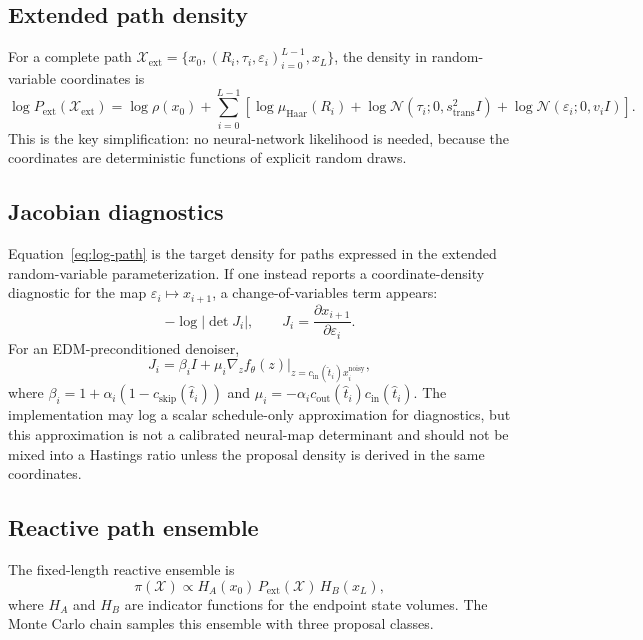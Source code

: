 \documentclass[11pt,a4paper]{article}
\newcommand{\N}{\mathcal{N}}
\newcommand{\Haar}{\mu_{\mathrm{Haar}}}
\newcommand{\ftheta}{f_\theta}
\newcommand{\that}{\hat t}
\newcommand{\xnoisy}{x^{\mathrm{noisy}}}
\newcommand{\cskip}{c_{\mathrm{skip}}}
\newcommand{\cout}{c_{\mathrm{out}}}
\newcommand{\cin}{c_{\mathrm{in}}}
\begin{document}
\subsection{Extended path density}

For a complete path
$\mathcal{X}_{\mathrm{ext}}=\{x_0,(R_i,\tau_i,\varepsilon_i)_{i=0}^{L-1},x_L\}$,
the density in random-variable coordinates is
\begin{equation}
  \log P_{\mathrm{ext}}(\mathcal{X}_{\mathrm{ext}})
  =
  \log \rho(x_0)
  +
  \sum_{i=0}^{L-1}
  \left[
    \log \Haar(R_i)
    + \log \N(\tau_i;0,s_{\mathrm{trans}}^2I)
    + \log \N(\varepsilon_i;0,v_iI)
  \right].
  \label{eq:log-path}
\end{equation}
This is the key simplification: no neural-network likelihood is needed, because
the coordinates are deterministic functions of explicit random draws.

\subsection{Jacobian diagnostics}

Equation~\eqref{eq:log-path} is the target density for paths expressed in the
extended random-variable parameterization. If one instead reports a
coordinate-density diagnostic for the map
$\varepsilon_i \mapsto x_{i+1}$, a change-of-variables term appears:
\begin{equation}
  -\log |\det J_i|,\qquad
  J_i = \frac{\partial x_{i+1}}{\partial \varepsilon_i}.
\end{equation}
For an EDM-preconditioned denoiser,
\begin{equation}
  J_i =
  \beta_i I
  +
  \mu_i \nabla_z \ftheta(z)\big|_{z=\cin(\that_i)\xnoisy_i},
\end{equation}
where $\beta_i=1+\alpha_i(1-\cskip(\that_i))$ and
$\mu_i=-\alpha_i\cout(\that_i)\cin(\that_i)$. The implementation may log a
scalar schedule-only approximation for diagnostics, but this approximation is
not a calibrated neural-map determinant and should not be mixed into a
Hastings ratio unless the proposal density is derived in the same coordinates.

\subsection{Reactive path ensemble}

The fixed-length reactive ensemble is
\begin{equation}
  \pi(\mathcal{X}) \propto
  H_A(x_0)\,P_{\mathrm{ext}}(\mathcal{X})\,H_B(x_L),
\end{equation}
where $H_A$ and $H_B$ are indicator functions for the endpoint state volumes.
The Monte Carlo chain samples this ensemble with three proposal classes.
\end{document}
